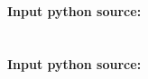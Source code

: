 \documentclass{mcmthesis}
\begin{document}
	\newpage
	
	\begin{appendices}
		\section{}
		\textcolor[rgb]{0.98,0.00,0.00}{\textbf{Input python source:}}
		
		\newpage
		\section{}
		\textcolor[rgb]{0.98,0.00,0.00}{\textbf{Input python source:}}
		
	\end{appendices}
\end{document}
